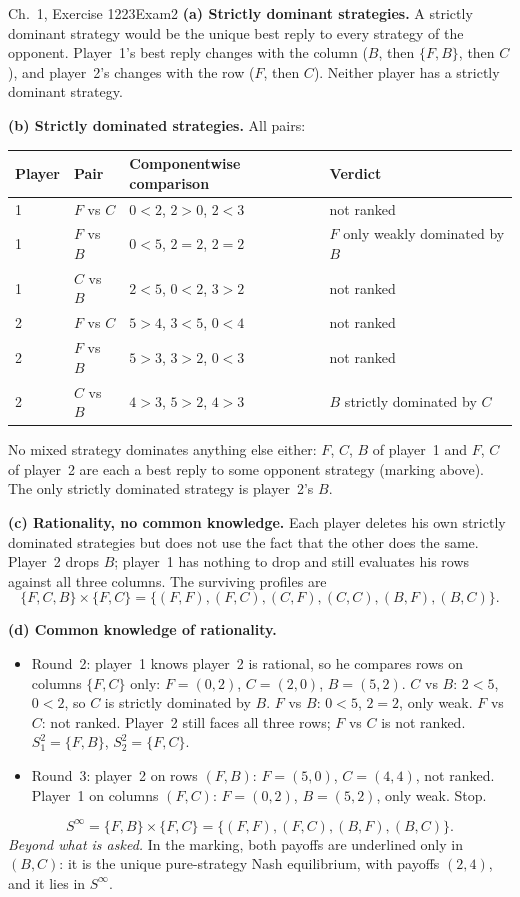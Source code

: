 \begin{exsol}{\MG{} Ch.~1, Exercise 12}{23}{Exam}{2}
\textbf{(a) Strictly dominant strategies.} A strictly dominant strategy would be the unique best
reply to every strategy of the opponent. Player~1's best reply changes with the column ($B$, then
$\{F,B\}$, then $C$), and player~2's changes with the row ($F$, then $C$). Neither player has a
strictly dominant strategy.

\textbf{(b) Strictly dominated strategies.} All pairs:
\begin{center}\small
\begin{tabular}{llll}
\toprule
Player & Pair & Componentwise comparison & Verdict \\
\midrule
1 & $F$ vs $C$ & $0<2$, $2>0$, $2<3$ & not ranked \\
1 & $F$ vs $B$ & $0<5$, $2=2$, $2=2$ & $F$ only weakly dominated by $B$ \\
1 & $C$ vs $B$ & $2<5$, $0<2$, $3>2$ & not ranked \\
2 & $F$ vs $C$ & $5>4$, $3<5$, $0<4$ & not ranked \\
2 & $F$ vs $B$ & $5>3$, $3>2$, $0<3$ & not ranked \\
2 & $C$ vs $B$ & $4>3$, $5>2$, $4>3$ & $B$ strictly dominated by $C$ \\
\bottomrule
\end{tabular}
\end{center}
No mixed strategy dominates anything else either: $F$, $C$, $B$ of player~1 and $F$, $C$ of
player~2 are each a best reply to some opponent strategy (marking above). The only strictly
dominated strategy is player~2's $B$.

\textbf{(c) Rationality, no common knowledge.} Each player deletes his own strictly dominated
strategies but does not use the fact that the other does the same. Player~2 drops $B$; player~1
has nothing to drop and still evaluates his rows against all three columns. The surviving
profiles are
\[
  \{F, C, B\} \times \{F, C\} = \{(F,F), (F,C), (C,F), (C,C), (B,F), (B,C)\}.
\]

\textbf{(d) Common knowledge of rationality.}
\begin{itemize}
  \item Round~2: player~1 knows player~2 is rational, so he compares rows on columns $\{F,C\}$
  only: $F = (0, 2)$, $C = (2, 0)$, $B = (5, 2)$. $C$ vs $B$: $2 < 5$, $0 < 2$, so $C$ is strictly
  dominated by $B$. $F$ vs $B$: $0 < 5$, $2 = 2$, only weak. $F$ vs $C$: not ranked. Player~2
  still faces all three rows; $F$ vs $C$ is not ranked. $S_1^2 = \{F,B\}$, $S_2^2 = \{F,C\}$.
  \item Round~3: player~2 on rows $(F, B)$: $F = (5, 0)$, $C = (4, 4)$, not ranked. Player~1 on
  columns $(F,C)$: $F = (0,2)$, $B = (5,2)$, only weak. Stop.
\end{itemize}
\[
  S^\infty = \{F, B\} \times \{F, C\} = \{(F,F), (F,C), (B,F), (B,C)\}.
\]
\emph{Beyond what is asked.} In the marking, both payoffs are underlined only in $(B,C)$: it is
the unique pure-strategy Nash equilibrium, with payoffs $(2,4)$, and it lies in $S^\infty$.


\end{exsol}
